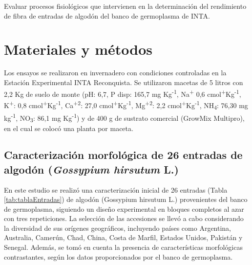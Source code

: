 \documentclass[12pt,oneside]{reedthesis}
\begin{document}
Evaluar procesos fisiológicos que intervienen en la determinación del rendimiento de fibra de entradas de algodón del banco de germoplasma de INTA.

\section{Materiales y métodos}\label{materiales-y-muxe9todos}

Los ensayos se realizaron en invernadero con condiciones controladas en la Estación Experimental INTA Reconquista. Se utilizaron macetas de 5 litros con 2,2 Kg de suelo de monte (pH: 6,7, P disp: 165,7 mg Kg\textsuperscript{-1}, Na\textsuperscript{+} 0,6 cmol\textsuperscript{+}Kg\textsuperscript{-1}, K\textsuperscript{+}: 0,8 cmol\textsuperscript{+}Kg\textsuperscript{-1}, Ca\textsuperscript{+2}: 27,0 cmol\textsuperscript{+}Kg\textsuperscript{-1}, Mg\textsuperscript{+2}: 2,2 cmol\textsuperscript{+}Kg\textsuperscript{-1}, NH\textsubscript{4}: 76,30 mg kg\textsuperscript{-1}, NO\textsubscript{3}: 86,1 mg Kg\textsuperscript{-1}) y de 400 g de sustrato comercial (GrowMix Multipro), en el cual se colocó una planta por maceta.

\subsection{\texorpdfstring{Caracterización morfológica de 26 entradas de algodón (\emph{Gossypium hirsutum} L.)}{Caracterización morfológica de 26 entradas de algodón (Gossypium hirsutum L.)}}\label{caracterizaciuxf3n-morfoluxf3gica-de-26-entradas-de-algoduxf3n-gossypium-hirsutum-l.}

En este estudio se realizó una caracterización inicial de 26 entradas (Tabla \ref{tab:tablaEntradas}) de algodón (Gossypium hirsutum L.) provenientes del banco de germoplasma, siguiendo un diseño experimental en bloques completos al azar con tres repeticiones. La selección de las accesiones se llevó a cabo considerando la diversidad de sus orígenes geográficos, incluyendo países como Argentina, Australia, Camerún, Chad, China, Costa de Marfil, Estados Unidos, Pakistán y Senegal. Además, se tomó en cuenta la presencia de características morfológicas contrastantes, según los datos proporcionados por el banco de germoplasma.
\end{document}

